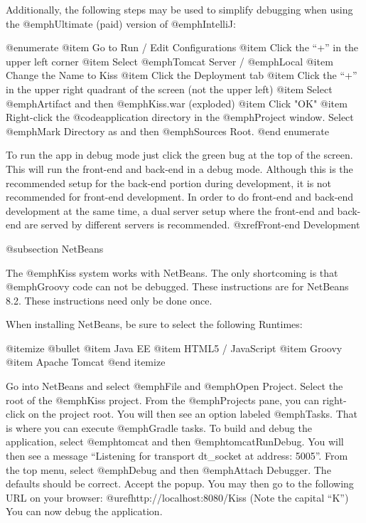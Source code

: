 Additionally, the following steps may be used to simplify debugging when using the @emph{Ultimate} (paid) version of @emph{IntelliJ}:



@enumerate
@item
Go to Run / Edit Configurations
@item
Click the ``+'' in the upper left corner
@item
Select @emph{Tomcat Server} / @emph{Local}
@item
Change the Name to Kiss
@item
Click the Deployment tab
@item
Click the ``+'' in the upper right quadrant of the screen (not the upper left)
@item
Select @emph{Artifact} and then @emph{Kiss.war} (exploded)
@item
Click "OK"
@item
Right-click the @code{application} directory in the @emph{Project} window.
Select @emph{Mark Directory as} and then @emph{Sources Root}.
@end enumerate

To run the app in debug mode just click the green bug at the top of the screen.  This will run the front-end and back-end 
in a debug mode.  Although this is the recommended setup for the back-end portion during development, it is not recommended
for front-end development.  In order to do front-end and back-end development at the same time, a dual server setup where
the front-end and back-end are served by different servers is recommended.    @xref{Front-end Development}

@subsection NetBeans

The @emph{Kiss} system works with NetBeans.  The only shortcoming is
that @emph{Groovy} code can not be debugged.  These instructions are
for NetBeans 8.2.  These instructions need only be done once.

When installing NetBeans, be sure to select the following Runtimes:

@itemize @bullet
@item
Java EE
@item
HTML5 / JavaScript
@item
Groovy
@item
Apache Tomcat
@end itemize

Go into NetBeans and select @emph{File} and @emph{Open Project}.
Select the root of the @emph{Kiss} project.  From the @emph{Projects}
pane, you can right-click on the project root.  You will then see an
option labeled @emph{Tasks}.  That is where you can execute
@emph{Gradle} tasks.  To build and debug the application, select
@emph{tomcat} and then @emph{tomcatRunDebug}.  You will then see a
message ``Listening for transport dt_socket at address: 5005''.  From
the top menu, select @emph{Debug} and then @emph{Attach Debugger}.
The defaults should be correct.  Accept the popup.  You may then go to
the following URL on your browser: @uref{http://localhost:8080/Kiss}
(Note the capital ``K'') You can now debug the application.


